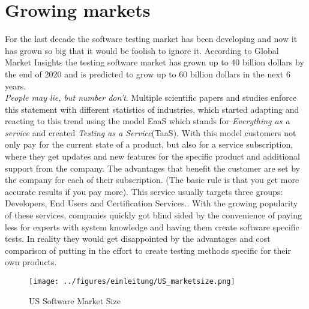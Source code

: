 \section{Growing markets}
For the last decade the software testing market has been developing and now it has grown so big that it would be foolish to ignore it. According to \dq Global Market Insights\dq{} the testing software market has grown up to 40 billion dollars by the end of 2020 and is predicted to grow up to 60 billion dollars in the next 6 years.\cite{GMI}\\
\textit{\dq People may lie, but number don't\dq}. Multiple scientific papers and studies enforce this statement with different statistics of industries, which started adapting and reacting to this trend using the model \dq EaaS\dq{} which stands for \textit{Everything as a service} and created \textit{ Testing as a Service}(TaaS). With this model customers not only pay for the current state of a product, but also for a service subscription, where they get updates and new features for the specific product and additional support from the company. The advantages that benefit the customer are set by the company for each of their subscription. (The basic rule is that you get more accurate results if you pay more). This service usually targets three groups: Developers, End Users and Certification Services.\cite{10.1145/1807128.1807153}. With the growing popularity of these services, companies quickly got blind sided by the convenience of paying less for experts with system knowledge and having them create software specific tests. In reality they would get disappointed by the advantages and cost comparison of putting in the effort to create testing methods specific for their own products. 
\begin{figure}[!htbp]
	\centering
	\texttt{[image: ../figures/einleitung/US\_marketsize.png]}
	\caption{US Software Market Size\cite{GMI}}
	\label{US_marketsize_graph}
\end{figure}

